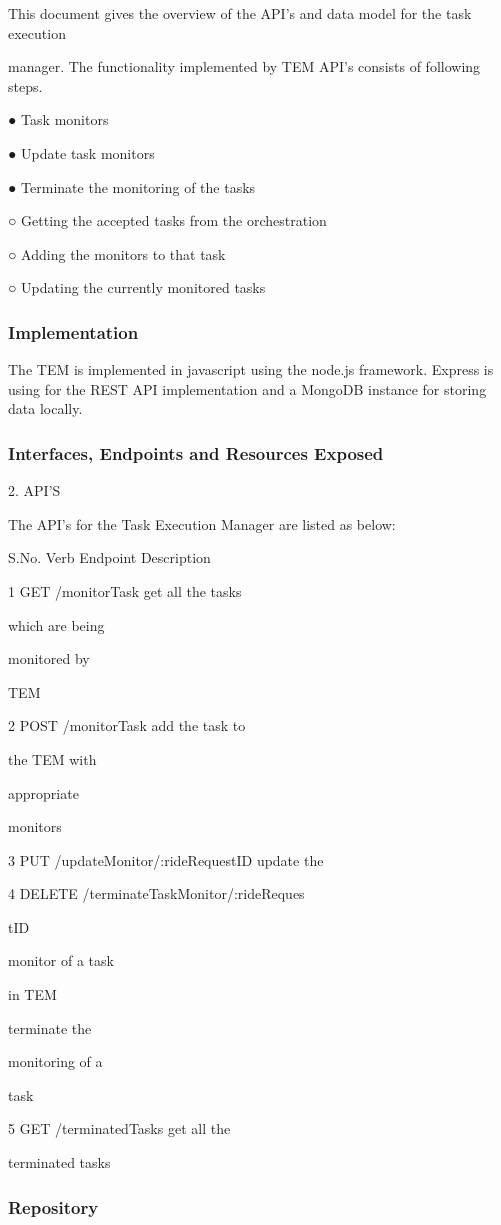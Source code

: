 This document gives the overview of the API’s and data model for the task execution

manager. The functionality implemented by TEM API’s consists of following steps.

● Task monitors

● Update task monitors

● Terminate the monitoring of the tasks

○ Getting the accepted tasks from the orchestration

○ Adding the monitors to that task

○ Updating the currently monitored tasks

\subsubsection{Implementation}
The TEM is implemented in javascript using the node.js framework. Express is using for the REST API implementation and a MongoDB instance for storing data locally.

\subsubsection{Interfaces, Endpoints and Resources Exposed}
2. API’S

The API’s for the Task Execution Manager are listed as below:

S.No. Verb Endpoint Description

1 GET /monitorTask get all the tasks

which are being

monitored by

TEM

2 POST /monitorTask add the task to

the TEM with

appropriate

monitors

3 PUT /updateMonitor/:rideRequestID update the

4 DELETE /terminateTaskMonitor/:rideReques

tID

monitor of a task

in TEM

terminate the

monitoring of a

task

5 GET /terminatedTasks get all the

terminated tasks
\subsubsection{Repository}